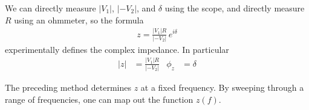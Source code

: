 \documentclass[11pt]{article}
\begin{document}
We can directly measure $|V_1|$, $|-V_2|$, and $\delta$ using the scope, and directly measure $R$ using an ohmmeter, so the formula 
\begin{align*}
z = \frac{|V_1| R}{|-V_2|} \, e^{i \delta } 
\end{align*}
experimentally defines the complex impedance. In particular
\begin{align*}
|z| &= \frac{|V_1| R}{|-V_2|}  &
\phi_z  &=  \delta
\end{align*}

The preceding method determines $z$ at a fixed frequency. By sweeping through a range of frequencies, one can map out the function $z(f)$.
\end{document}
